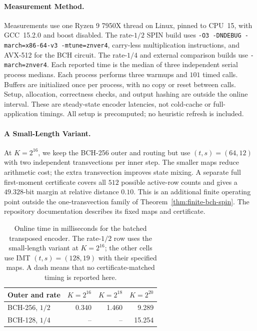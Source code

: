 \paragraph{Measurement Method.}
Measurements use one Ryzen 9 7950X thread on Linux, pinned to CPU~15, with
GCC~15.2.0 and boost disabled. The rate-$1/2$ SPIN build uses
\texttt{-O3 -DNDEBUG -march=x86-64-v3 -mtune=znver4},
carry-less multiplication instructions, and AVX-512 for the BCH circuit.
The rate-$1/4$ and external comparison builds use \texttt{-march=znver4}.
Each reported time is the median of three independent serial process medians.
Each process performs three warmups and $101$ timed calls. Buffers are initialized
once per process, with no copy or reset between calls.
Setup, allocation, correctness checks, and output hashing
are outside the online interval. These are steady-state encoder latencies,
not cold-cache or full-application timings. All setup is precomputed;
no heuristic refresh is included.

\paragraph{A Small-Length Variant.}
\label{app:small-k-variant}
At $K=2^{16}$, we keep the BCH-256 outer and routing but use
$(t,s)=(64,12)$ with two independent transvections per inner step.
The smaller maps reduce arithmetic cost; the extra transvection improves
state mixing. A separate full first-moment certificate covers all
$512$ possible active-row counts and gives a $49.328$-bit margin at
relative distance $0.10$.
This is an additional finite operating point outside the
one-transvection family of Theorem~\ref{thm:finite-bch-spin}.
The repository documentation describes its fixed maps and
certificate\repositorycite.

\begin{table}[tb]
\centering
\caption{Online time in milliseconds for the batched transposed encoder.
The rate-$1/2$ row uses the small-length variant at $K=2^{16}$;
the other cells use IMT $(t,s)=(128,19)$ with their specified maps.
A dash means that no certificate-matched timing is reported here.}
\label{tab:finite-bch-performance}
\begin{tabular}{@{}lrrr@{}}
\toprule
Outer and rate & $K=2^{16}$ & $K=2^{18}$ & $K=2^{20}$ \\
\midrule
BCH-256, $1/2$ & 0.340 & 1.460 & 9.289 \\
BCH-128, $1/4$ & -- & -- & 15.254 \\
\bottomrule
\end{tabular}
\end{table}

